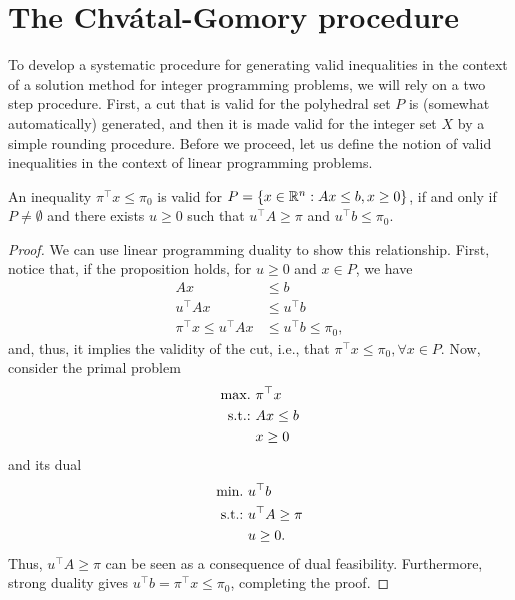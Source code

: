 \section{The Chv\'atal-Gomory procedure}

To develop a systematic procedure for generating valid inequalities in the context of a solution method for integer programming problems, we will rely on a two step procedure. First, a cut that is valid for the polyhedral set $P$ is (somewhat automatically) generated, and then it is made valid for the integer set $X$ by a simple rounding procedure. Before we proceed, let us define the notion of valid inequalities in the context of linear programming problems.

\begin{proposition} \label{p1c10:prop:valid_inequality_LP}
	An inequality $\pi^\top x \leq \pi_0$ is valid for $P = \left\{ x \in \mathbb{R}^n : Ax \leq b, x \geq 0 \right \}$, if and only if $P \neq \emptyset$ and there exists $u \geq 0$ such that $u^\top A \geq \pi$ and $u^\top b \leq \pi_0$.
\end{proposition}

\begin{proof}
	We can use linear programming duality to show this relationship. First, notice that, if the proposition holds, for $u \ge 0$ and $x \in P$, we have 
	\begin{align*}
		Ax & \le b \\
		u^\top Ax & \le u^\top b \\
		\pi ^\top x \le u^\top Ax & \le u^\top b \le \pi_0,
	\end{align*}
	and, thus, it implies the validity of the cut, i.e., that $\pi^\top x \leq \pi_0, \forall x \in P$. Now, consider the primal problem
	\begin{align*}
		\mathop{\text{max.~}} & \pi ^\top x \\
		\mathop{\text{s.t.:~}}   & Ax \leq b \\
		      & x \geq 0
	\end{align*}
	and its dual 
	\begin{align*}
		\mathop{\text{min.~}} & u^\top b \\
		\mathop{\text{s.t.:~}}   & u^\top A \geq \pi \\
		      & u \geq 0. 
	\end{align*}
	Thus, $u^\top A\geq \pi$ can be seen as a consequence of dual feasibility. Furthermore, strong duality gives $u^\top b = \pi ^\top x \leq \pi_0$, completing the proof. 
\end{proof}

